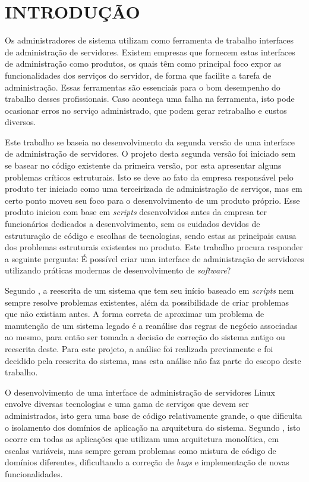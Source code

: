 \chapter{INTRODUÇÃO}
\label{chp:intro}

Os administradores de sistema utilizam como ferramenta de trabalho interfaces
de administração de servidores. Existem empresas que fornecem estas interfaces
de administração como produtos, os quais têm como principal foco expor as
funcionalidades dos serviços do servidor, de forma que facilite a tarefa de
administração. Essas ferramentas são essenciais para o bom desempenho do
trabalho desses profissionais. Caso aconteça uma falha na ferramenta, isto
pode ocasionar erros no serviço administrado, que podem gerar retrabalho
e custos diversos.

Este trabalho se baseia no desenvolvimento da segunda versão de uma
interface de administração de servidores. O projeto desta segunda versão
foi iniciado sem se basear no código existente da primeira versão, por esta
apresentar alguns problemas críticos estruturais. Isto se deve ao fato da
empresa responsável pelo produto ter iniciado como uma terceirizada de
administração de serviços, mas em certo ponto moveu seu foco para o
desenvolvimento de um produto próprio. Esse produto iniciou com base em
\emph{scripts} desenvolvidos antes da empresa ter funcionários dedicados a
desenvolvimento, sem os cuidados devidos de estruturação de código e escolhas
de tecnologias, sendo estas as principais causa dos problemas estruturais
existentes no produto. Este trabalho procura responder a seguinte pergunta:
É possível criar uma interface de administração de servidores utilizando
práticas modernas de desenvolvimento de \emph{software}?

Segundo , a reescrita de um sistema que tem seu
início baseado em \emph{scripts} nem sempre resolve problemas existentes,
além da possibilidade de criar problemas que não existiam antes. A forma
correta de aproximar um problema de manutenção de um sistema legado é a
reanálise das regras de negócio associadas ao mesmo, para então ser tomada
a decisão de correção do sistema antigo ou reescrita deste. Para este projeto,
a análise foi realizada previamente e foi decidido pela reescrita do sistema,
mas esta análise não faz parte do escopo deste trabalho.

O desenvolvimento de uma interface de administração de servidores Linux
envolve diversas tecnologias e uma gama de serviços que devem ser
administrados, isto gera uma base de código relativamente grande, o que
dificulta o isolamento dos domínios de aplicação na arquitetura
do sistema. Segundo , isto ocorre em todas as aplicações
que utilizam uma arquitetura monolítica, em escalas variáveis, mas sempre
geram problemas como mistura de código de domínios diferentes, dificultando
a correção de \emph{bugs} e implementação de novas funcionalidades.

